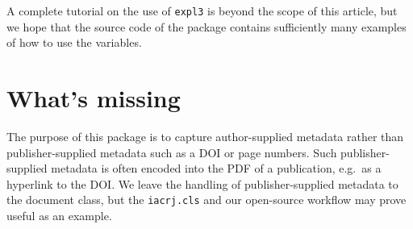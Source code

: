\documentclass{article}
\newcommand{\pkg}[1]{\texttt{#1}}
\begin{document}
A complete tutorial on the use of \texttt{expl3} is beyond the scope
of this article, but we hope that the source code of the package
contains sufficiently many examples of how to use the variables.

\section{What's missing}\label{missing}
The purpose of this package is to capture author-supplied metadata rather
than publisher-supplied metadata such as a DOI or page numbers. Such
publisher-supplied metadata is often encoded into the PDF of a
publication, e.g.\ as a hyperlink to the DOI. We leave the handling of
publisher-supplied metadata to the document class, but the \pkg{iacrj.cls}
and our open-source workflow may prove useful as an example.
\end{document}
